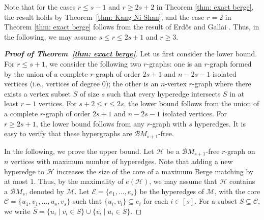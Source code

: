 \documentclass[11pt]{article}
\numberwithin{equation}{section}
\newcounter{cases}
\newcommand\cB{{\mathcal B}}
\newcommand\cC{{\mathcal C}}
\newcommand\cE{{\mathcal E}}
\newcommand\cH{{\mathcal H}}
\newcommand\cM{{\mathcal M}}
\begin{document}
Note that for the cases $r \le s-1$ and $r \ge 2s+2$ in Theorem \ref{thm: exact berge}, the result holds by Theorem~\ref{thm: Kang Ni Shan},
and the case  $r=2$ in Theorem \ref{thm: exact berge} follows from the
result of Erd\H{o}s and Gallai \cite{gallai1959maximal}. %
Thus, in the following, we may assume $s \le r \le 2s+1$ and $r \ge 3$.



\begin{proof}[\bf Proof of Theorem~\ref{thm: exact berge}] 
    Let us first consider the lower bound.
    For $r \le s+1$, we consider the following two $r$-graphs:
    one is an $r$-graph formed by the union of a complete $r$-graph of order \(2s+1\) and \(n-2s-1\) isolated vertices (i.e., vertices of degree 0); the other is an $n$-vertex $r$-graph where there exists a vertex subset $S$ of size $s$ such that every hyperedge intersects $S$ in at least $r-1$ vertices.
    For $s+2 \leq r \leq 2s$, the lower bound follows from the union of a complete $r$-graph of order \(2s+1\) and \(n-2s-1\) isolated vertices. For $r\geq2s+1$, the lower bound follows from any $r$-graph with $s$ hyperedges.
    It is easy to verify that these hypergraphs are $\mathcal{B}M_{s+1}$-free.

    In the following, we prove the upper bound.
    Let $\mathcal{H}$ be a $\cB M_{s+1}$-free $r$-graph on $n$ vertices with maximum number of hyperedges.
    Note that adding a new hyperedge to $\cH$ increases the size of the core of a maximum Berge matching by at most $1$.
    Thus, by the maximality of $e(\cH)$, we may assume that $\mathcal{H}$ contains a $\cB M_s$, denoted by $\cM$. Let $\cE=\{e_1,\dots,e_s\}$ be the hyperedges of $\cM$, with the core $\cC = \{u_1,v_1,\dots,u_s,v_s\}$ such that $\{u_i,v_i\}\subseteq e_i$ for each $i\in [s]$.
    For a subset $S \subseteq \cC$, we write $\overline{S} = \{u_i \mid v_i \in S\} \cup \{v_i \mid u_i \in S\}$.


\end{proof}
\end{document}
